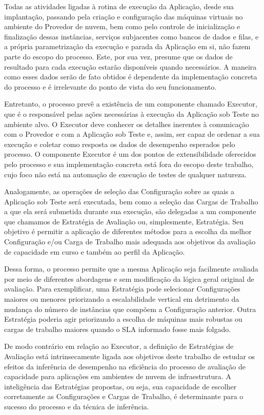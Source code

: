 Todas as atividades ligadas à rotina de execução da Aplicação, desde sua implantação,
passando pela criação e configuração das máquinas virtuais no ambiente do Provedor 
de nuvem, bem como pelo controle de inicialização e finalização dessas instâncias, 
serviços subjacentes como bancos de dados e filas, e a própria parametrização da 
execução e parada da Aplicação em si, não fazem parte do escopo do processo. Este,
por sua vez, presume que os dados de resultado para cada execução estarão disponíveis
quando necessários. A maneira como esses dados serão de fato obtidos é dependente
da implementação concreta do processo e é irrelevante do ponto de vista do seu 
funcionamento.  

Entretanto, o processo prevê a existência de um componente chamado Executor, que é 
o responsável pelas ações necessárias à execução da Aplicação sob Teste no ambiente
alvo. O Executor deve conhecer os detalhes inerentes à comunicação com o Provedor 
e com a Aplicação sob Teste e, assim, ser capaz de ordenar a sua execução e coletar
como resposta os dados de desempenho esperados pelo processo. O componente Executor
é um dos pontos de extensibilidade oferecidos pelo processo e sua implementação
concreta está fora do escopo deste trabalho, cujo foco não está na automação de
execução de testes de qualquer natureza.

Analogamente, as operações de seleção das Configuração sobre as quais a Aplicação
sob Teste será executada, bem como a seleção das Cargas de Trabalho a que ela 
será submetida durante sua execução, são delegadas a um componente que chamamos de
Estratégia de Avaliação ou, simplesmente, Estratégia. Seu objetivo é permitir a
aplicação de diferentes métodos para a escolha da melhor Configuração e/ou Carga 
de Trabalho mais adequada aos objetivos da avaliação de capacidade em curso e 
também ao perfil da Aplicação.

Dessa forma, o processo permite que a mesma Aplicação seja facilmente avaliada 
por meio de diferentes abordagens e sem modificação da lógica geral original de 
avaliação. Para exemplificar, uma Estratégia pode selecionar Configurações 
maiores ou menores priorizando a escalabilidade vertical em detrimento da mudança
do número de instâncias que compõem a Configuração anterior. Outra Estratégia 
poderia agir priorizando a escolha de máquinas mais robustas ou cargas de trabalho
maiores quando o SLA informado fosse mais folgado.

De modo contrário em relação ao Executor, a definição de Estratégias de Avaliação
está intrinsecamente ligada aos objetivos deste trabalho de estudar os efeitos da
inferência de desempenho na eficiência do processo de avaliação de capacidade para
aplicações em ambientes de nuvem de infraestrutura. A inteligência das Estratégias
propostas, ou seja, sua capacidade de escolher corretamente as Configurações e 
Cargas de Trabalho, é determinante para o sucesso do processo e da técnica de 
inferência. 

